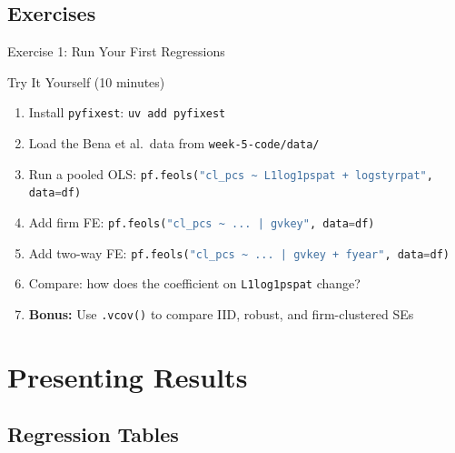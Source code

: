 \documentclass[9pt,aspectratio=169]{beamer}
\newcommand{\py}[1]{\lstinline[language=Python]{#1}}
\begin{document}
\subsection{Exercises}
\begin{frame}[fragile]{Exercise 1: Run Your First Regressions}

\begin{alertblock}{Try It Yourself (10 minutes)}
\begin{enumerate}
    \item Install \texttt{pyfixest}: \texttt{uv add pyfixest}
    \item Load the Bena et al.\ data from \texttt{week-5-code/data/}
    \item Run a pooled OLS: \py{pf.feols("cl_pcs ~ L1log1pspat + logstyrpat", data=df)}
    \item Add firm FE: \py{pf.feols("cl_pcs ~ ... | gvkey", data=df)}
    \item Add two-way FE: \py{pf.feols("cl_pcs ~ ... | gvkey + fyear", data=df)}
    \item Compare: how does the coefficient on \texttt{L1log1pspat} change?
    \item \textbf{Bonus:} Use \py{.vcov()} to compare IID, robust, and firm-clustered SEs
\end{enumerate}
\end{alertblock}

\end{frame}


\section{Presenting Results}
\subsection{Regression Tables}
\end{document}
